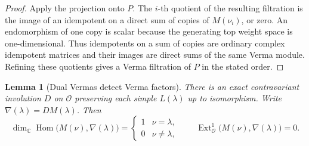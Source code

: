 \documentclass[11pt,oneside,openany]{book}
\newtheorem{lemma}[theorem]{Lemma}
\theoremstyle{definition}
\theoremstyle{remark}
\begin{document}
\begin{proof}
Apply the projection onto \(P\). The \(i\)-th quotient of the
resulting filtration is the image of an idempotent on a direct
sum of copies of \(M(\nu_i)\), or zero. An endomorphism of one
copy is scalar because the generating top weight space is
one-dimensional. Thus idempotents on a sum of copies are
ordinary complex idempotent matrices and their images are
direct sums of the same Verma module. Refining these quotients
gives a Verma filtration of \(P\) in the stated order.
\end{proof}

\begin{lemma}[Dual Vermas detect Verma factors]
\label{res:LO06}
There is an exact contravariant involution \(D\) on
\(\mathcal O\) preserving each simple \(L(\lambda)\) up to
isomorphism. Write \(\nabla(\lambda)=D M(\lambda)\). Then
\[
 \dim_{\mathbb C}\operatorname{Hom}\bigl(M(\nu),\nabla(\lambda)\bigr)
   =\begin{cases}1&\nu=\lambda,\\0&\nu\ne\lambda,\end{cases}
 \qquad
 \operatorname{Ext}^1_{\mathcal O}\bigl(M(\nu),\nabla(\lambda)\bigr)=0 .
\]
\end{lemma}
\end{document}
